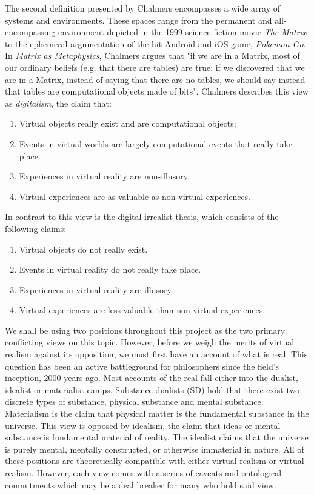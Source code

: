 The second definition presented by Chalmers encompasses a wide array of systems and environments. These spaces range from the permanent and all-encompassing environment depicted in the 1999 science fiction movie \textit{The Matrix} to the ephemeral argumentation of the hit Android and iOS game, \textit{Pokemon Go}. In \textit{Matrix as Metaphysics}, Chalmers argues that "if we are in a Matrix, most of our ordinary beliefs (e.g. that there are tables) are true: if we discovered that we are in a Matrix, instead of saying that there are no tables, we should say instead that tables are computational objects made of bits". Chalmers describes this view as \textit{digitalism}, the claim that: \begin{enumerate}
	\item Virtual objects really exist and are computational objects;
\item Events in virtual worlds are largely computational events that really take place. \item Experiences in virtual reality are non-illusory.
\item Virtual experiences are as valuable as non-virtual experiences. \end{enumerate} In contrast to this view is the digital irrealist thesis, which consists of the following claims: \begin{enumerate}
\item Virtual objects do not really exist.
\item Events in virtual reality do not really take place.
\item Experiences in virtual reality are illusory.
\item Virtual experiences are less valuable than non-virtual experiences.
\end{enumerate} \cite{ChalmersVR} We shall be using two positions throughout this project as the two primary conflicting views on this topic. However, before we weigh the merits of virtual realism against its opposition, we must first have an account of what is real. This question has been an active battleground for philosophers since the field's inception, 2000 years ago. Most accounts of the real fall either into the dualist, idealist or materialist camps. Substance dualists (SD) hold that there exist two discrete types of substance, physical substance and mental substance.  Materialism is the claim that physical matter is the fundamental substance in the universe. This view is opposed by idealism, the claim that ideas or mental substance is fundamental material of reality. The idealist claims that the universe is purely mental, mentally constructed, or otherwise immaterial in nature. All of these positions are theoretically compatible with either virtual realism or virtual realism. However, each view comes with a series of caveats and ontological commitments which may be a deal breaker for many who hold said view. 
